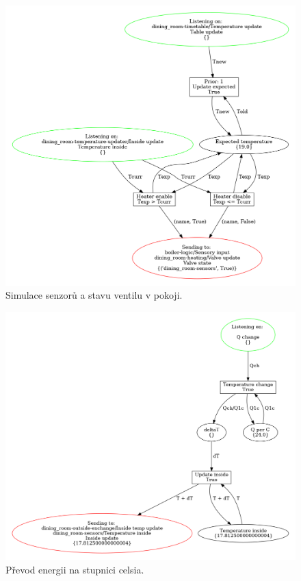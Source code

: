 \begin{figure}[htb]
  \centering
  \includegraphics[width=\textwidth]{obrazky-figures/room-sensors.png}
  \caption{Simulace senzorů a stavu ventilu v pokoji.}
  \label{sensor-viz}
\end{figure}

\begin{figure}[htb]
  \centering
  \includegraphics[width=\textwidth]{obrazky-figures/room-temp-upd.png}
  \caption{Převod energii na stupnici celsia.}
  \label{room-temp-viz}
\end{figure}


